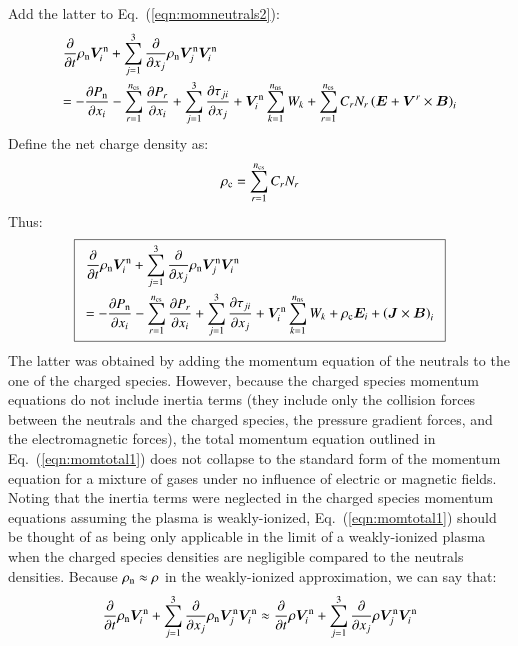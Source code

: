 \documentclass{warpdoc}
\newcommand\frameeqn[1]{\fbox{$\displaystyle #1$}}
\newcommand{\alb}{\vspace{0.1cm}\\} %
\newcommand{\mfd}{\displaystyle}
\newcommand{\nns}{{n_{\rm ns}}}
\newcommand{\ncs}{{n_{\rm cs}}}
\renewcommand{\vec}[1]{\bm{#1}}
\begin{document}
%
Add the latter to Eq.\ (\ref{eqn:momneutrals2}):
%
\begin{equation}
\begin{array}{l}\mfd
   \frac{\partial  }{\partial t}\rho_{\rm n} \vec{V}_i^{\rm n}
  + \sum_{j=1}^3  \frac{\partial }{\partial x_j}\rho_{\rm n} \vec{V}_j^{\rm n} \vec{V}_i^{\rm n}
\alb\mfd
=
-\frac{\partial P_{\rm n}}{\partial x_i} 
-\sum_{r=1}^\ncs \frac{\partial P_r}{\partial x_i} 
+ \sum_{j=1}^3 \frac{\partial \tau_{ji}}{\partial x_j}
+\vec{V}_i^{\rm n} \sum_{k=1}^\nns  W_k
+ \sum_{r=1}^\ncs C_r N_r \left(\vec{E}+\vec{V}^r \times \vec{B}\right)_i
\end{array}
\end{equation}
%
Define the net charge density as:
%
\begin{equation}
\rho_{\rm c}=\sum_{r=1}^\ncs C_r N_r
\end{equation}
%
Thus:
%
\begin{equation}
\frameeqn{
\begin{array}{l}\mfd
   \frac{\partial  }{\partial t}\rho_{\rm n} \vec{V}_i^{\rm n}
  + \sum_{j=1}^3  \frac{\partial }{\partial x_j}\rho_{\rm n} \vec{V}_j^{\rm n} \vec{V}_i^{\rm n}
\alb\mfd =
-\frac{\partial P_{\rm n}}{\partial x_i} 
-\sum_{r=1}^\ncs \frac{\partial P_r}{\partial x_i} 
+ \sum_{j=1}^3 \frac{\partial \tau_{ji}}{\partial x_j}
+\vec{V}_i^{\rm n} \sum_{k=1}^\nns  W_k
+ \rho_{\rm c} \vec{E}_i +\left(\vec{J} \times \vec{B}\right)_i
\end{array}
}
\label{eqn:momtotal1}
\end{equation}
%
The latter was obtained by adding the momentum equation of the neutrals to the one of the charged species. However, because the charged species momentum equations do not include inertia terms (they include only the collision forces between the neutrals and the charged species, the pressure gradient forces, and the electromagnetic forces), the total momentum equation outlined in Eq.\ (\ref{eqn:momtotal1}) does not collapse to the standard form of the momentum equation for a mixture of gases under no influence of electric or magnetic fields. Noting that the inertia terms were neglected in the charged species momentum equations assuming the plasma is weakly-ionized, Eq.\ (\ref{eqn:momtotal1}) should be thought of as being only applicable in the limit of a weakly-ionized plasma when the charged species densities are negligible compared to the neutrals densities. Because $\rho_{\rm n} \approx \rho$ in the weakly-ionized approximation, we can say that:
%
\begin{equation}
   \frac{\partial  }{\partial t}\rho_{\rm n} \vec{V}_i^{\rm n}
  + \sum_{j=1}^3  \frac{\partial }{\partial x_j}\rho_{\rm n} \vec{V}_j^{\rm n} \vec{V}_i^{\rm n}
\approx
   \frac{\partial  }{\partial t}\rho \vec{V}_i^{\rm n}
  + \sum_{j=1}^3  \frac{\partial }{\partial x_j}\rho \vec{V}_j^{\rm n} \vec{V}_i^{\rm n}  
\label{eqn:momtotal2}
\end{equation}
\end{document}

